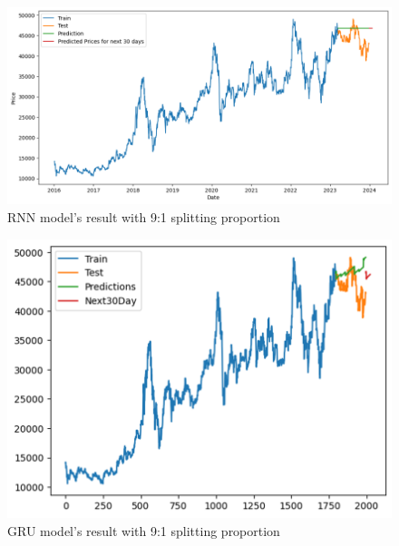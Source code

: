 \documentclass{ieeeojies}
\begin{document}
\begin{figure}[H]
  \centering
  \begin{minipage}{0.8\linewidth}
    \centering
    \includegraphics[width=\linewidth]{bibliography/SARIMA_BIDV91.png}
    \caption{RNN model's result with 9:1 splitting proportion}
    \label{fig26}
  \end{minipage}
\end{figure}
\begin{figure}[H]
  \centering
  \begin{minipage}{0.8\linewidth}
    \centering
        \includegraphics[width=\linewidth]{bibliography/BIDV_DLM91.png}
    \caption{GRU model's result with 9:1 splitting proportion}
    \label{fig27}
  \end{minipage}
\end{figure}
\end{document}
